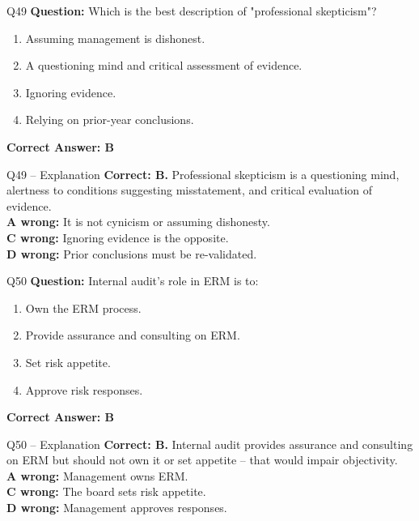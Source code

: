 \documentclass[aspectratio=169,10pt]{beamer}
\begin{document}
	\begin{frame}[t]{Q49}
		\small
		\textbf{Question:} Which is the best description of "professional skepticism"?
		\begin{enumerate}[label=\Alph*.,itemsep=1pt,topsep=2pt]
			\item Assuming management is dishonest.
			\item A questioning mind and critical assessment of evidence.
			\item Ignoring evidence.
			\item Relying on prior-year conclusions.
		\end{enumerate}
		\vspace{4pt}
		\textbf{Correct Answer: B}
	\end{frame}
	
	\begin{frame}[t]{Q49 -- Explanation}
		\small
		\textbf{Correct: B.} Professional skepticism is a questioning mind, alertness to conditions suggesting misstatement, and critical evaluation of evidence. \\[4pt]
		\textbf{A wrong:} It is not cynicism or assuming dishonesty. \\[2pt]
		\textbf{C wrong:} Ignoring evidence is the opposite. \\[2pt]
		\textbf{D wrong:} Prior conclusions must be re-validated.
	\end{frame}
	
	\begin{frame}[t]{Q50}
		\small
		\textbf{Question:} Internal audit's role in ERM is to:
		\begin{enumerate}[label=\Alph*.,itemsep=1pt,topsep=2pt]
			\item Own the ERM process.
			\item Provide assurance and consulting on ERM.
			\item Set risk appetite.
			\item Approve risk responses.
		\end{enumerate}
		\vspace{4pt}
		\textbf{Correct Answer: B}
	\end{frame}
	
	\begin{frame}[t]{Q50 -- Explanation}
		\small
		\textbf{Correct: B.} Internal audit provides assurance and consulting on ERM but should not own it or set appetite -- that would impair objectivity. \\[4pt]
		\textbf{A wrong:} Management owns ERM. \\[2pt]
		\textbf{C wrong:} The board sets risk appetite. \\[2pt]
		\textbf{D wrong:} Management approves responses.
	\end{frame}
	
\end{document}
